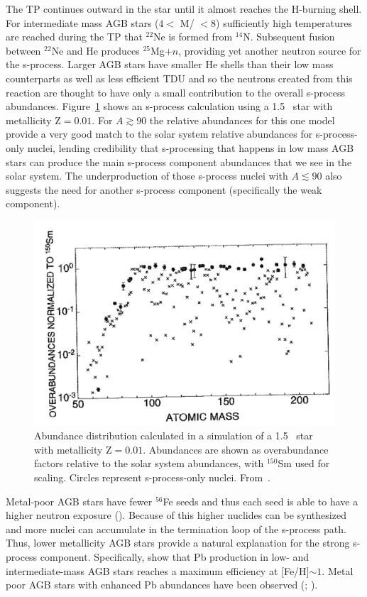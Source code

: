 The TP continues outward in the star until it almost reaches the
H-burning shell.  For intermediate mass  AGB stars ($4<$ M/\Msol
$< 8$) sufficiently high temperatures are reached during the TP that 
 $^{22}$Ne is formed from $^{14}$N.  Subsequent fusion
between $^{22}$Ne and He produces $^{25}$Mg$+n$, providing yet another
neutron source for the s-process.  Larger AGB stars have smaller He
shells than their low mass counterparts as well as less efficient TDU
and so the neutrons created from this reaction are thought to have
only a small contribution to the overall s-process abundances.
Figure~\ref{fig:sproc} shows an s-process calculation using a 1.5
\Msol\ star with metallicity Z$=0.01$. For $A\gtrsim90$ the
relative abundances for this one model provide a very good match to
the solar system relative abundances for s-process-only nuclei,
lending credibility that s-processing that happens in low mass AGB
stars can produce the main s-process component abundances that we see
in the solar system.  The underproduction of those s-process nuclei
with $A\lesssim90$ also suggests the need for another s-process
component (specifically the weak component).
\begin{figure}
\includegraphics[width=\linewidth]{pdf/sproc.png}
\caption{\label{fig:sproc} Abundance distribution calculated in a
  simulation of a 1.5 \Msol\ star with metallicity Z$=0.01$.
  Abundances are shown as overabundance factors relative to the solar
  system abundances, with $^{150}$Sm used for scaling.  Circles
  represent s-process-only nuclei.  From~\cite{arlandinietal1999}.}
\end{figure}

Metal-poor AGB stars have fewer $^{56}$Fe seeds and thus each seed is
able to have a higher neutron exposure (\citealt{gallinoetal1998}).
Because of this higher nuclides can be synthesized and more nuclei can
accumulate in the termination loop of the s-process path.  Thus, lower
metallicity AGB stars provide a natural explanation for the strong
s-process component.  Specifically, \cite{travaglioetal2001} show that 
Pb production
in low- and intermediate-mass AGB stars reaches a maximum efficiency
at [Fe/H]$\sim 1$.  Metal poor AGB stars with enhanced Pb abundances
have been observed (\citealt{vaneck2001}; \citealt{vanecketal2003}).

